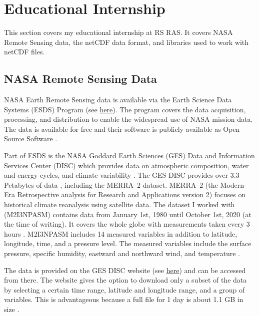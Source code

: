 \documentclass[../00_main.tex]{subfiles}
\begin{document}
\section{Educational Internship}

This section covers my educational internship at RS RAS. It covers NASA Remote
Sensing data, the netCDF data format, and libraries used to work with netCDF
files.

\subsection{NASA Remote Sensing Data}

NASA Earth Remote Sensing data is available via the Earth Science Data Systems 
(ESDS) Program (see \href{https://earthdata.nasa.gov/esds}{here}). The program 
covers the data acquisition, processing, and distribution to enable the 
widespread use of NASA mission data. The data is available for free and their
software is publicly available as Open Source Software 
\cite{esds-website}.\newline

Part of ESDS is the NASA Goddard Earth Sciences (GES) Data and Information 
Services Center (DISC) which provides data on atmospheric composition, water
and energy cycles, and climate variability \cite{gesdisc-about}. The GES DISC 
provides over 3.3 Petabytes of data \cite{gesdisc-main}, including the MERRA--2 
dataset. MERRA--2 (the Modern-Era Retrospective analysis for Research and 
Applications version 2) focuses on historical climate reanalysis using 
satellite data. The dataset I worked with (M2I3NPASM) contains data from 
January 1st, 1980 until October 1st, 2020 (at the time of writing). It covers 
the whole globe with measurements taken every 3 hours \cite{data-summary}. 
M2I3NPASM includes 14 measured variables in addition to latitude, longitude, 
time, and a pressure level. The measured variables include the surface 
pressure, specific humidity, eastward and northward wind, and temperature
\cite{data-readme}.\newline

The data is provided on the GES DISC website (see
\href{https://disc.gsfc.nasa.gov/datasets/M2I3NPASM_5.12.4/summary}{here}) and 
can be accessed from there. The website gives the option to download only a 
subset of the data by selecting a certain time range, latitude and longitude 
range, and a group of variables. This is advantageous because a full file for 
1 day is about 1.1 GB in size \cite{data-readme}.\newline
\end{document}
